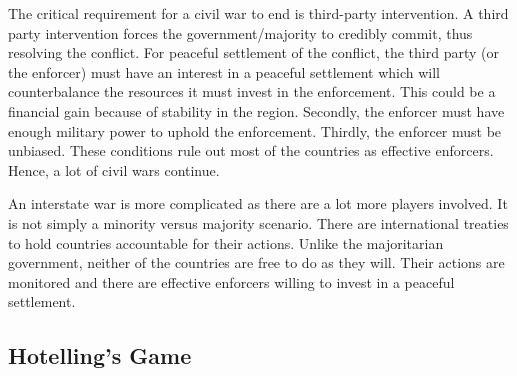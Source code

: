 \documentclass{article}
\theoremstyle{definition}
\begin{document}
The critical requirement for a civil war to end is third-party intervention. A third party intervention forces the government/majority to credibly commit, thus resolving the conflict. For peaceful settlement of the conflict, the third party (or the enforcer) must have an interest in a peaceful settlement which will counterbalance the resources it must invest in the enforcement. This could be a financial gain because of stability in the region. Secondly, the enforcer must have enough military power to uphold the enforcement. Thirdly, the enforcer must be unbiased. These conditions rule out most of the countries as effective enforcers. Hence, a lot of civil wars continue. \smallskip

An interstate war is more complicated as there are a lot more players involved. It is not simply a minority versus majority scenario. There are international treaties to hold countries accountable for their actions. Unlike the majoritarian government, neither of the countries are free to do as they will. Their actions are monitored and there are effective enforcers willing to invest in a peaceful settlement. \smallskip

\subsection{Hotelling's Game}
\end{document}
